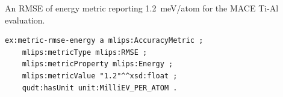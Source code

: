An RMSE of energy metric reporting 1.2~meV/atom for the MACE Ti-Al evaluation.
\begin{lstlisting}[language=turtle]
ex:metric-rmse-energy a mlips:AccuracyMetric ;
    mlips:metricType mlips:RMSE ;
    mlips:metricProperty mlips:Energy ;
    mlips:metricValue "1.2"^^xsd:float ;
    qudt:hasUnit unit:MilliEV_PER_ATOM .
\end{lstlisting}
